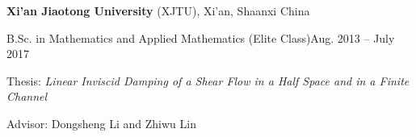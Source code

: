 \documentclass[margin,line]{res}
\newenvironment{list1}{
  \begin{list}{\ding{113}}{%
      \setlength{\itemsep}{0in}
      \setlength{\parsep}{0in} \setlength{\parskip}{0in}
      \setlength{\topsep}{0in} \setlength{\partopsep}{0in} 
      \setlength{\leftmargin}{0.17in}}}{\end{list}}
\begin{document}
\begin{resume}
{\bf Xi'an Jiaotong University} (XJTU), Xi'an, Shaanxi China\\
\vspace*{-.1in}
\begin{list1}
\item[] B.Sc. in Mathematics and Applied Mathematics (Elite Class)\hfill Aug. 2013 -- July 2017
\item[] Thesis: \textit{Linear Inviscid Damping of a Shear Flow in a Half Space and in a Finite Channel}
\item[] Advisor: Dongsheng Li and Zhiwu Lin
\end{list1}






\end{resume}
\end{document}
